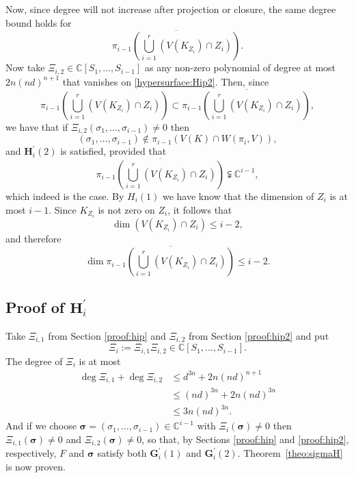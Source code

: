 \documentclass[a4paper]{article}
\def\C{\mathbb{C}}
\begin{document}
\noindent 
Now, since degree will not increase after projection or closure, the same degree bound holds for
\begin{equation}\label{hypersurface:Hip2} 
\overline{\pi_{i-1} \left(\bigcup_{i=1}^r \left(V(K_{Z_i}) \cap Z_i\right)\right)}.
\end{equation}
Now take $\Xi_{i,2} \in \C[S_1,\hdots,S_{i-1}]$ as any non-zero polynomial of degree at most $2n(nd)^{n+1}$ that vanishes on \ref{hypersurface:Hip2}. Then, since 
\[
\pi_{i-1} \left(\bigcup_{i=1}^r \left(V(K_{Z_i}) \cap Z_i\right)\right) \subset\overline{\pi_{i-1} \left(\bigcup_{i=1}^r \left(V(K_{Z_i}) \cap Z_i\right)\right)},
\]
we have that if $\Xi_{i,2}(\sigma_1,\hdots,\sigma_{i-1}) \not = 0$ then
\[
(\sigma_1,\hdots,\sigma_{i-1}) \not \in \pi_{i-1} (V(K) \cap W(\pi_i,V)),
\]
and $\bm H_i^{'}(2)$ is satisfied, provided that 
\[
\overline{\pi_{i-1} \left(\bigcup_{i=1}^r \left(V(K_{Z_i}) \cap Z_i\right)\right)} \subsetneqq \C^{i-1},
\]
which indeed is the case. By $H_i(1)$ we have know that the dimension of $Z_i$ is at most $i-1.$ Since $K_{Z_i}$ is not zero on $Z_i$, it follows that 
\[
\dim \left(V(K_{Z_i}) \cap Z_i\right) \leq i-2, 
\]
and therefore 
\[
\dim \overline{\pi_{i-1} \left(\bigcup_{i=1}^r \left(V(K_{Z_i}) \cap Z_i\right)\right)} \leq i-2. 
\]
\subsection{Proof of $\textbf{H}_i^{'}$}\label{proof:hipf}
Take $\Xi_{i,1}$ from Section \ref{proof:hip} and $\Xi_{i,2}$ from Section \ref{proof:hip2} and put  
\[
\Xi_i := \Xi_{i,1} \Xi_{i,2} \in \C[S_1,\hdots,S_{i-1}].
\]
The degree of $\Xi_i$ is at most 
\begin{align*}
\deg \Xi_{i,1} + \deg \Xi_{i,2} & \leq d^{3n} + 2n(nd)^{n+1}\\
& \leq (nd)^{3n} + 2n(nd)^{3n}\\
& \leq 3n(nd)^{3n}.
\end{align*}
And if we choose $\bm \sigma = (\sigma_1,\hdots, \sigma_{i-1}) \in \C^{i-1}$ with 
$\Xi_i(\bm \sigma) \not = 0$ then $\Xi_{i,1}(\bm \sigma) \not = 0$ and $\Xi_{i,2}(\bm \sigma) \not = 0$, so that, by Sections \ref{proof:hip} and \ref{proof:hip2}, respectively, $F$ and $\bm \sigma$ satisfy both $\bm G_i^{'}(1)$ and $\bm G_i^{'}(2).$  
Theorem~\ref{theo:sigmaH} is now proven.
\end{document}
